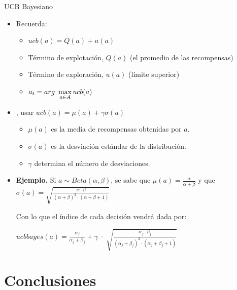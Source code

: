 \documentclass[10pt, envcountsect, handout, aspectratio=1610, hyperref={hypertexnames=true}]{beamer}
\begin{document}
\begin{frame}{UCB Bayesiano}
\begin{itemize}
\item Recuerda:
	\begin{itemize}
	\item $ucb(a)=Q(a) + u(a) $
	\item Término de explotación, $Q(a)$ (el promedio de las recompensas)
	\item Término de exploración, $u(a)$ (límite superior)
	\item $\displaystyle a_t = arg\ \max_{a\in A} ucb(a)$
	\end{itemize}

\item {}, usar $ucb(a) = \mu(a) + \gamma \sigma(a) $
	\begin{itemize}
	\item $\mu(a)$ es la media de recompensas obtenidas por $a$.
	\item $\sigma(a)$ es la desviación estándar de la distribución.
	\item $\gamma$ determina el número de desviaciones.
	\end{itemize}
	
\item \textbf{Ejemplo.} Si $a\sim Beta(\alpha, \beta)$, se sabe que
$\mu(a) =\frac{\alpha}{\alpha + \beta}$  y que $\sigma(a) =\sqrt{\frac{\alpha \cdot \beta}{(\alpha + \beta)^2 \cdot (\alpha + \beta + 1)}}$

Con lo que el índice de cada decisión vendrá dada por:

\hfil $
ucbbayes(a) = \frac{\alpha_j}{\alpha_j + \beta_j} + \gamma \; \cdot \; \sqrt{\frac{\alpha_j \cdot \beta_j}{(\alpha_j + \beta_j)^2 \cdot (\alpha_j + \beta_j + 1)}}
$
\end{itemize}

\end{frame}




\section{Conclusiones}

\end{document}

